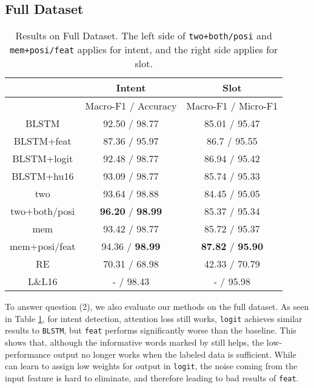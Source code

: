 

\subsection{Full Dataset}

\begin{table}
\setlength{\tabcolsep}{0.23em}
\centering
\small{
\begin{tabular}{|c|c|c|}

\hline
 & Intent & Slot \\ 
\hline
  & Macro-F1 / Accuracy &  Macro-F1 / Micro-F1 \\
\hline
BLSTM & 92.50 / 98.77  & 85.01 / 95.47\\
\hline
BLSTM+feat & 87.36 / 95.97 & 86.7 / 95.55\\
\hline
BLSTM+logit & 92.48 / 98.77 & 86.94 / 95.42  \\
\hline
BLSTM+hu16 & 93.09 / 98.77 & 85.74 / 95.33  \\
\hline
two & 93.64 / 98.88  & 84.45 / 95.05\\
\hline
two+both/posi & \textbf{96.20} / \textbf{98.99} & 85.37 / 95.34 \\
\hline
mem & 93.42 / 98.77 & 85.72 / 95.37\\
\hline
mem+posi/feat & 94.36 / \textbf{98.99} & \textbf{87.82} / \textbf{95.90} \\
\hline
\hline
RE & 70.31 / 68.98 & 42.33 / 70.79\\
\hline
L\&L16 & - / 98.43 & - / 95.98\\
\hline 

\end{tabular}
}
\caption{Results on Full Dataset. The left side of \texttt{two+both/posi} and \texttt{mem+posi/feat} applies for intent, and the right side applies for slot.} 
\label{tab_full}
\end{table}

To answer question (2), we also evaluate our methods on the full dataset. As seen in Table \ref{tab_full}, for intent detection, attention loss still works, \texttt{logit} achieves similar results to \texttt{BLSTM}, but \texttt{feat} performs significantly worse than the baseline. This shows that, although the informative words marked by \RE still helps, the low-performance \RE output no longer works when the labeled data is sufficient. While \NN can learn to assign low weights for \RE output in \texttt{logit}, the noise coming from the input feature is hard to eliminate, and therefore leading to bad results of \texttt{feat}.

